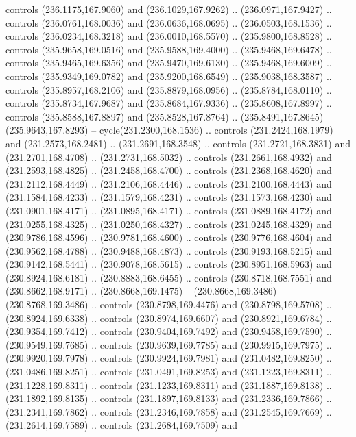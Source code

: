 \begin{scope}[cm={{1.25,0.0,0.0,-1.25,(0.0,442.91375)}}]
    controls (236.1175,167.9060) and (236.1029,167.9262) .. (236.0971,167.9427) ..
    controls (236.0761,168.0036) and (236.0636,168.0695) .. (236.0503,168.1536) ..
    controls (236.0234,168.3218) and (236.0010,168.5570) .. (235.9800,168.8528) ..
    controls (235.9658,169.0516) and (235.9588,169.4000) .. (235.9468,169.6478) ..
    controls (235.9465,169.6356) and (235.9470,169.6130) .. (235.9468,169.6009) ..
    controls (235.9349,169.0782) and (235.9200,168.6549) .. (235.9038,168.3587) ..
    controls (235.8957,168.2106) and (235.8879,168.0956) .. (235.8784,168.0110) ..
    controls (235.8734,167.9687) and (235.8684,167.9336) .. (235.8608,167.8997) ..
    controls (235.8588,167.8897) and (235.8528,167.8764) .. (235.8491,167.8645) --
    (235.9643,167.8293) -- cycle(231.2300,168.1536) .. controls
    (231.2424,168.1979) and (231.2573,168.2481) .. (231.2691,168.3548) .. controls
    (231.2721,168.3831) and (231.2701,168.4708) .. (231.2731,168.5032) .. controls
    (231.2661,168.4932) and (231.2593,168.4825) .. (231.2458,168.4700) .. controls
    (231.2368,168.4620) and (231.2112,168.4449) .. (231.2106,168.4446) .. controls
    (231.2100,168.4443) and (231.1584,168.4233) .. (231.1579,168.4231) .. controls
    (231.1573,168.4230) and (231.0901,168.4171) .. (231.0895,168.4171) .. controls
    (231.0889,168.4172) and (231.0255,168.4325) .. (231.0250,168.4327) .. controls
    (231.0245,168.4329) and (230.9786,168.4596) .. (230.9781,168.4600) .. controls
    (230.9776,168.4604) and (230.9562,168.4788) .. (230.9488,168.4873) .. controls
    (230.9193,168.5215) and (230.9142,168.5441) .. (230.9078,168.5615) .. controls
    (230.8951,168.5963) and (230.8924,168.6181) .. (230.8883,168.6455) .. controls
    (230.8718,168.7551) and (230.8662,168.9171) .. (230.8668,169.1475) --
    (230.8668,169.3486) -- (230.8768,169.3486) .. controls (230.8798,169.4476) and
    (230.8798,169.5708) .. (230.8924,169.6338) .. controls (230.8974,169.6607) and
    (230.8921,169.6784) .. (230.9354,169.7412) .. controls (230.9404,169.7492) and
    (230.9458,169.7590) .. (230.9549,169.7685) .. controls (230.9639,169.7785) and
    (230.9915,169.7975) .. (230.9920,169.7978) .. controls (230.9924,169.7981) and
    (231.0482,169.8250) .. (231.0486,169.8251) .. controls (231.0491,169.8253) and
    (231.1223,169.8311) .. (231.1228,169.8311) .. controls (231.1233,169.8311) and
    (231.1887,169.8138) .. (231.1892,169.8135) .. controls (231.1897,169.8133) and
    (231.2336,169.7866) .. (231.2341,169.7862) .. controls (231.2346,169.7858) and
    (231.2545,169.7669) .. (231.2614,169.7589) .. controls (231.2684,169.7509) and

\end{scope}
